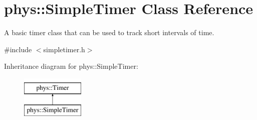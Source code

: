 \hypertarget{classphys_1_1SimpleTimer}{
\section{phys::SimpleTimer Class Reference}
\label{d0/d15/classphys_1_1SimpleTimer}
}


A basic timer class that can be used to track short intervals of time.  




{\ttfamily \#include $<$simpletimer.h$>$}

Inheritance diagram for phys::SimpleTimer:\begin{figure}[H]
\begin{center}
\leavevmode
\includegraphics[height=2.000000cm]{d0/d15/classphys_1_1SimpleTimer}
\end{center}
\end{figure}
